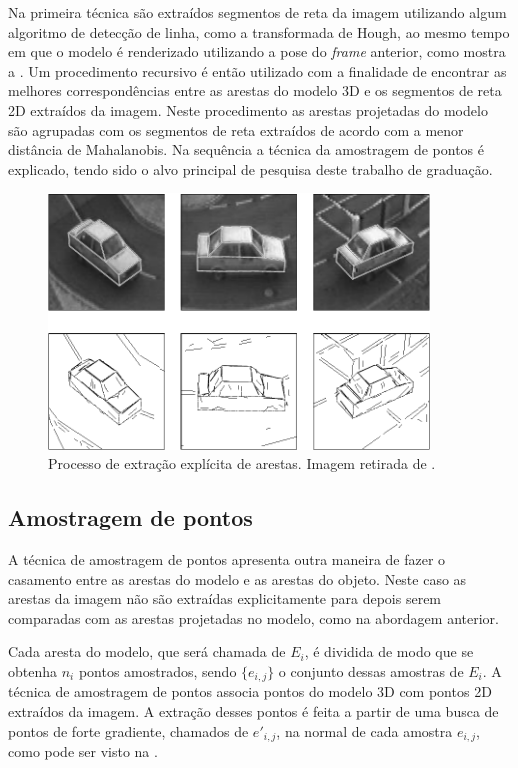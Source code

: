 \label{sec:extracao_explicita}
Na primeira técnica são extraídos segmentos de reta da imagem utilizando algum algoritmo de detecção de linha, como a transformada de Hough, ao mesmo tempo em que o modelo é renderizado utilizando a pose do \emph{frame} anterior, como mostra a . Um procedimento recursivo é então utilizado com a finalidade de encontrar as melhores correspondências entre as arestas do modelo 3D e os segmentos de reta 2D extraídos da imagem. Neste procedimento as arestas projetadas do modelo são agrupadas com os segmentos de reta extraídos de acordo com a menor distância de Mahalanobis. Na sequência a técnica da amostragem de pontos é explicado, tendo sido o alvo principal de pesquisa deste trabalho de graduação.

\begin{figure}[!t]
\centering\includegraphics[width=0.9\textwidth]{monografia/carro_extracao_explicita}
\caption{Processo de extração explícita de arestas. Imagem retirada de \cite{extracao_explicita}.}
\label{carro_extracao_explicita}
\end{figure}

\subsection{Amostragem de pontos}
\label{sec:amostragem_de_pontos}

A técnica de amostragem de pontos \cite{drummondecipolla} apresenta outra maneira de fazer o casamento entre as arestas do modelo e as arestas do objeto. Neste caso as arestas da imagem não são extraídas explicitamente para depois serem comparadas com as arestas projetadas no modelo, como na abordagem anterior.

Cada aresta do modelo, que será chamada de $E_i$, é dividida de modo que se obtenha $n_i$ pontos amostrados, sendo $\{e_{i,j}\}$ o conjunto dessas amostras de $E_i$. A técnica de amostragem de pontos associa pontos do modelo 3D com pontos 2D extraídos da imagem. A extração desses pontos é feita a partir de uma busca de pontos de forte gradiente, chamados de $e'_{i,j}$, na normal de cada amostra $e_{i,j}$, como pode ser visto na .

